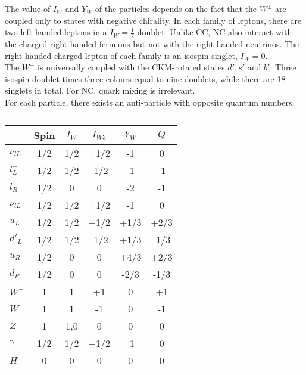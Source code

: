 \documentclass[10.75pt,a4paper,openright,bottom=2cm]{article}
\begin{document}
The value of $I_W$ and $Y_W$ of the particles depends on the fact that the $W^\pm$ are coupled only to states with negative chirality. In each family of leptons, there are two left-handed leptons in a $I_W=\frac{1}{2}$ doublet. Unlike CC, NC also interact with the charged right-handed fermions but not with the right-handed neutrinos. The right-handed charged lepton of each family is an isospin singlet, $I_W=0$.\\
The $W^\pm$ is universally coupled with the CKM-rotated states $d',s'$ and $b'$. Three isospin doublet times three colours equal to nine doublets, while there are 18 singlets in total. For NC, quark mixing is irrelevant.\\
For each particle, there exists an anti-particle with opposite quantum numbers.
\begin{table}[h]
    \centering
    \begin{tabular}{l|ccccc}
    \hline
    \cellcolor{gray!50} & \cellcolor{yellow!50}Spin & \cellcolor{yellow!50}$I_W$ & \cellcolor{yellow!50}$I_{W3}$ & \cellcolor{yellow!50}$Y_W$ & \cellcolor{yellow!50}$Q$\\
    \hline\hline
    \cellcolor{yellow!50}$\nu_{lL}$ & 1/2 & 1/2 & +1/2 & -1 & 0 \\
    \hline
    \cellcolor{yellow!50}$l^-_L$ & 1/2 & 1/2 & -1/2 & -1 & -1 \\
    \hline
    \cellcolor{yellow!50}$l^-_R$ & 1/2 & 0 & 0 & -2 & -1 \\
    \hline
    \cellcolor{yellow!50}$\nu_{lL}$ & 1/2 & 1/2 & +1/2 & -1 & 0 \\
    \hline
    \cellcolor{yellow!50}$u_{L}$ & 1/2 & 1/2 & +1/2 & +1/3 & +2/3 \\
    \hline
    \cellcolor{yellow!50}$d'_{L}$ & 1/2 & 1/2 & -1/2 & +1/3 & -1/3 \\
    \hline
    \cellcolor{yellow!50}$u_{R}$ & 1/2 & 0 & 0 & +4/3 & +2/3 \\
    \hline
    \cellcolor{yellow!50}$d_{R}$ & 1/2 & 0 & 0 & -2/3 & -1/3 \\
    \hline\hline
    \cellcolor{yellow!50}$W^+$ & 1 & 1 & +1 & 0 & +1 \\
    \hline
    \cellcolor{yellow!50}$W^-$ & 1 & 1 & -1 & 0 & -1 \\
    \hline
    \cellcolor{yellow!50}$Z$ & 1 & 1,0 & 0 & 0 & 0 \\
    \hline
    \cellcolor{yellow!50}$\gamma$ & 1/2 & 1/2 & +1/2 & -1 & 0 \\
    \hline\hline
    \cellcolor{yellow!50}$H$ & 0 & 0 & 0 & 0 & 0\\
    \hline
    \end{tabular}
    \caption*{}
    \label{tab:my_label}
\end{table}\newline
\end{document}
